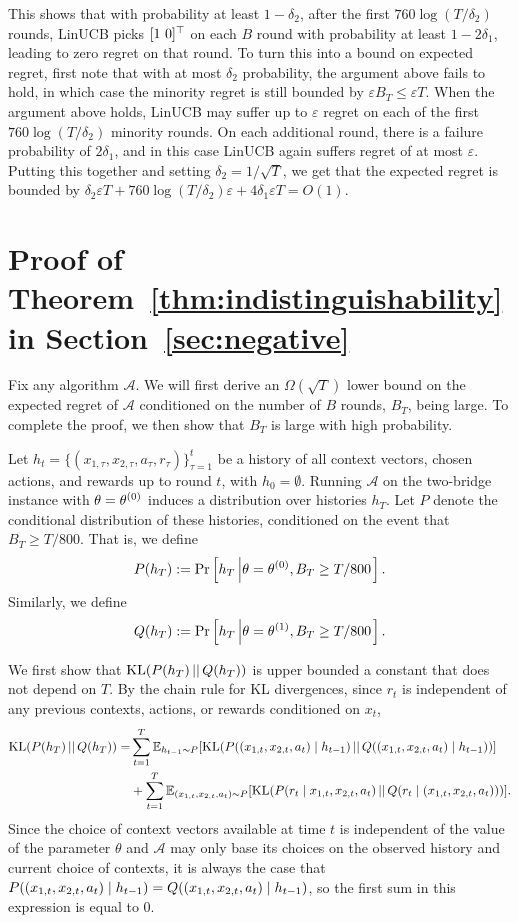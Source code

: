 This shows that with probability at least $1-\delta_2$, after the
first $760 \log (T/\delta_2)$ rounds, LinUCB picks $[1 ~ 0]^{\top}$ on
each $B$ round with probability at least $1-2\delta_1$, leading to
zero regret on that round.  To turn this into a bound on expected
regret, first note that with at most $\delta_2$ probability, the
argument above fails to hold, in which case the minority regret is
still bounded by $\varepsilon B_T \leq \varepsilon T$.  When the argument
above holds, LinUCB may suffer up to $\varepsilon$ regret on each of the
first $760 \log (T/\delta_2)$ minority rounds.  On each additional
round, there is a failure probability of $2\delta_1$, and in this case
LinUCB again suffers regret of at most $\varepsilon$.  Putting this
together and setting $\delta_2 = 1/\sqrt{T}$, we get that the expected
regret is bounded by
$\delta_2 \varepsilon T
+ 760 \log(T/\delta_2) \varepsilon
+ 4\delta_1 \varepsilon T
= O(1)$.

\section{Proof of Theorem~\ref{thm:indistinguishability} in Section~\ref{sec:negative}}

  Fix any algorithm $\mathcal{A}$. We will first derive an
  $\Omega(\sqrt{T})$ lower bound on the expected regret of
  $\mathcal{A}$ conditioned on the number of
  $B$ rounds, $B_T$, being large. To complete the proof, we then show
  that $B_T$ is large
  with high probability.

  Let $h_t = \{(x_{1,\tau}, x_{2,\tau}, a_\tau, r_\tau)\}_{\tau=1}^t$ be a
  history of all context vectors, chosen actions, and rewards up to
  round $t$, with $h_0 = \emptyset$. Running $\mathcal{A}$ on the
  two-bridge instance with $\theta = \theta^{(0)}$ induces a
  distribution over histories $h_T$. Let $P$ denote the conditional
  distribution of these histories, conditioned on the event that $B_T
  \geq T/800$.  That is, we define
\[
P(h_T) := \Pr\left[h_T \left\vert \theta = \theta^{(0)}, B_T \geq
    T/800 \right.\right].
\]
  Similarly, we define
\[
Q(h_T) := \Pr\left[h_T \left\vert \theta = \theta^{(1)}, B_T \geq
    T/800 \right.\right].
\]

We first show that $\text{KL}(P(h_T) \, ||\, Q(h_T))$ is upper bounded a constant
that does not depend on $T$.
By the
  chain rule for KL divergences, since $r_t$ is independent of any
  previous contexts, actions, or rewards conditioned on $x_t$,
\begin{align*}
  \text{KL}(P(h_T) \, ||\, Q(h_T))
   =
  & \sum_{t=1}^T \operatorname{\mathbb{E}}_{h_{t-1} \sim P}[\text{KL}(P((x_{1,t}, x_{2,t}, a_t) \;|\;
    h_{t-1}) \, ||\, Q((x_{1,t}, x_{2,t}, a_t) \;|\; h_{t-1}))] \\
  & + \sum_{t=1}^T \operatorname{\mathbb{E}}_{(x_{1,t}, x_{2,t}, a_t) \sim P} [\text{KL}(P(r_t \;|\; x_{1,t}, x_{2,t}, a_t) \, ||\, Q(r_t
    \;|\; (x_{1,t}, x_{2,t}, a_t)))] .
\end{align*}
Since the choice of context vectors available at time $t$ is
independent of the value of the parameter $\theta$ and $\mathcal{A}$
may only base its choices on the observed history and current choice
of contexts, it is always the case that
$P((x_{1,t}, x_{2,t}, a_t) \;|\; h_{t-1}) = Q((x_{1,t}, x_{2,t}, a_t)
\;|\; h_{t-1})$, so the first sum in this expression is equal to 0.

